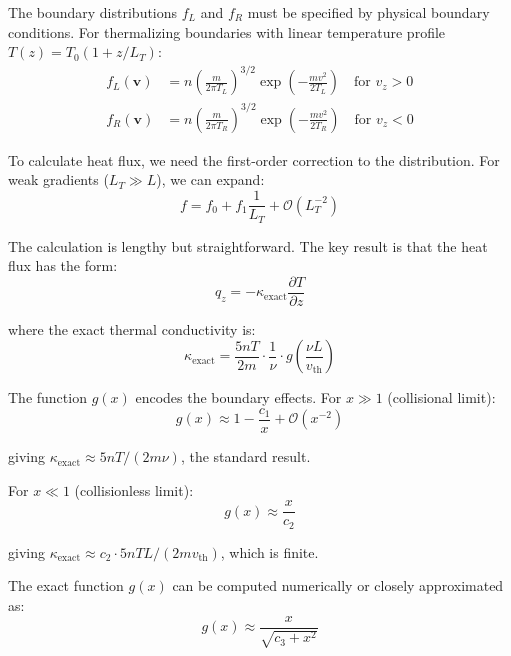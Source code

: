 \documentclass[12pt,a4paper]{article}
\newcommand{\vect}[1]{\mathbf{#1}}
\begin{document}
The boundary distributions $f_L$ and $f_R$ must be specified by physical boundary conditions. For thermalizing boundaries with linear temperature profile $T(z) = T_0(1 + z/L_T)$:
\begin{align}
f_L(\vect{v}) &= n\left(\frac{m}{2\pi T_L}\right)^{3/2} \exp\left(-\frac{m v^2}{2T_L}\right) \quad \text{for } v_z > 0\label{eq:boundary_left}\\
f_R(\vect{v}) &= n\left(\frac{m}{2\pi T_R}\right)^{3/2} \exp\left(-\frac{m v^2}{2T_R}\right) \quad \text{for } v_z < 0\label{eq:boundary_right}
\end{align}

To calculate heat flux, we need the first-order correction to the distribution. For weak gradients ($L_T \gg L$), we can expand:
\begin{equation}
f = f_0 + f_1 \frac{1}{L_T} + \mathcal{O}(L_T^{-2})
\label{eq:gradient_expansion}
\end{equation}

The calculation is lengthy but straightforward. The key result is that the heat flux has the form:
\begin{equation}
q_z = -\kappa_{\text{exact}} \frac{\partial T}{\partial z}
\label{eq:heat_flux_exact}
\end{equation}

where the exact thermal conductivity is:
\begin{equation}
\kappa_{\text{exact}} = \frac{5nT}{2m} \cdot \frac{1}{\nu} \cdot g\left(\frac{\nu L}{v_{\text{th}}}\right)
\label{eq:kappa_exact}
\end{equation}

The function $g(x)$ encodes the boundary effects. For $x \gg 1$ (collisional limit):
\begin{equation}
g(x) \approx 1 - \frac{c_1}{x} + \mathcal{O}(x^{-2})
\label{eq:g_collisional}
\end{equation}

giving $\kappa_{\text{exact}} \approx 5nT/(2m\nu)$, the standard result.

For $x \ll 1$ (collisionless limit):
\begin{equation}
g(x) \approx \frac{x}{c_2}
\label{eq:g_collisionless}
\end{equation}

giving $\kappa_{\text{exact}} \approx c_2 \cdot 5nTL/(2mv_{\text{th}})$, which is finite.

The exact function $g(x)$ can be computed numerically or closely approximated as:
\begin{equation}
g(x) \approx \frac{x}{\sqrt{c_3 + x^2}}
\label{eq:g_approximate}
\end{equation}
\end{document}
